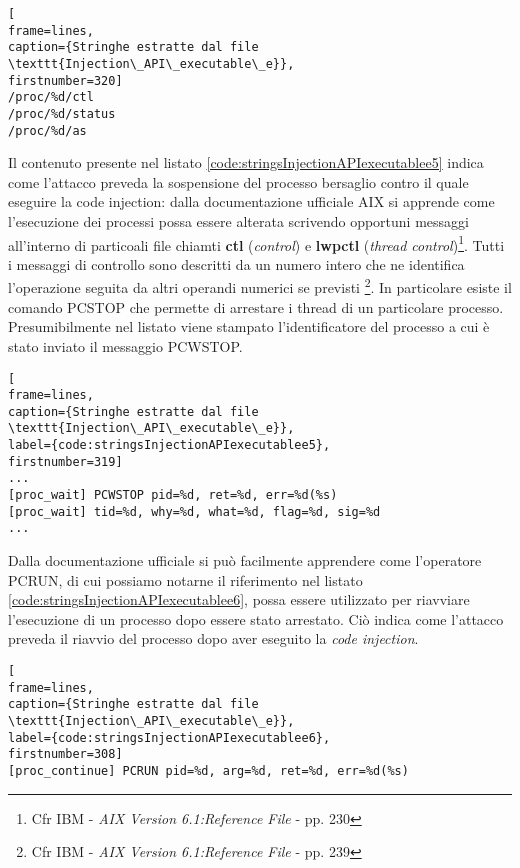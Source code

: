 \documentclass[10pt,a4paper, titlepage]{report}
\begin{document}
\begin{lstlisting}[
frame=lines, 
caption={Stringhe estratte dal file \texttt{Injection\_API\_executable\_e}},
firstnumber=320]
/proc/%d/ctl
/proc/%d/status
/proc/%d/as
\end{lstlisting}

Il contenuto presente nel listato \ref{code:stringsInjectionAPIexecutablee5} indica come l'attacco preveda la sospensione del processo bersaglio contro il quale eseguire la code injection: dalla documentazione ufficiale AIX si apprende come l'esecuzione dei processi possa essere alterata scrivendo opportuni messaggi
 all'interno di particoali file chiamti \textbf{ctl} (\textit{control}) e \textbf{lwpctl} (\textit{thread control})\footnote{Cfr IBM - \textit{AIX Version 6.1:Reference File} - pp. 230}. Tutti i messaggi di controllo sono descritti da un numero intero che ne identifica l'operazione seguita da altri operandi numerici se previsti 
 \footnote{Cfr IBM - \textit{AIX Version 6.1:Reference File} - pp. 239}. In particolare esiste il comando PCSTOP che permette di arrestare i thread di un particolare processo. Presumibilmente nel listato viene stampato l'identificatore del processo a cui è stato inviato il messaggio PCWSTOP.
 

\begin{lstlisting}[
frame=lines, 
caption={Stringhe estratte dal file \texttt{Injection\_API\_executable\_e}}, 
label={code:stringsInjectionAPIexecutablee5},
firstnumber=319]
...
[proc_wait] PCWSTOP pid=%d, ret=%d, err=%d(%s)
[proc_wait] tid=%d, why=%d, what=%d, flag=%d, sig=%d
...
\end{lstlisting}

Dalla documentazione ufficiale si può facilmente apprendere come l'operatore PCRUN, di cui possiamo notarne il riferimento nel  listato \ref{code:stringsInjectionAPIexecutablee6}, possa essere utilizzato per riavviare l'esecuzione di un processo dopo essere stato arrestato. Ciò indica come l'attacco preveda il riavvio del processo dopo aver eseguito la \textit{code injection}.

\begin{lstlisting}[
frame=lines, 
caption={Stringhe estratte dal file \texttt{Injection\_API\_executable\_e}}, 
label={code:stringsInjectionAPIexecutablee6},
firstnumber=308]
[proc_continue] PCRUN pid=%d, arg=%d, ret=%d, err=%d(%s)
\end{lstlisting}
\end{document}
